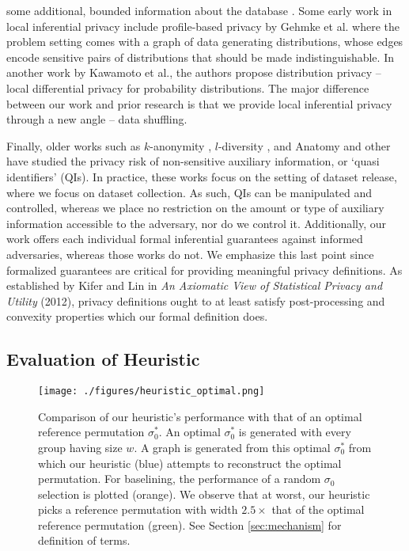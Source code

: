 some additional, bounded information about the database 
\cite{bounded}. Some early work in local inferential privacy include profile-based privacy \cite{profile} by Gehmke et al. where the problem setting comes with a graph of data generating distributions, whose edges encode sensitive pairs of distributions that should be made indistinguishable. In another work by Kawamoto et al., the authors propose distribution privacy \cite{takao} -- local differential privacy for probability distributions.    The major difference between our work and prior research is that we provide local inferential privacy through a new angle -- data shuffling. 

Finally, older works such as $k$-anonymity \cite{kanon},  $l$-diversity \cite{ldiv}, and Anatomy \cite{anatomy} and other \cite{older1, older2, older3, older4, older5} have studied the privacy risk of non-sensitive auxiliary information, or `quasi identifiers' (QIs). In practice, these works focus on the setting of dataset release, where we focus on dataset collection. As such, QIs can be manipulated and controlled, whereas we place no restriction on the amount or type of auxiliary information accessible to the adversary, nor do we control it. Additionally, our work offers each individual formal inferential guarantees against informed adversaries, whereas those works do not. We emphasize this last point since formalized guarantees are critical for providing meaningful privacy definitions. As established by Kifer and Lin in \emph{An Axiomatic View of Statistical Privacy and Utility} (2012), privacy definitions ought to at least satisfy post-processing and convexity properties which our formal definition does.



 
\newpage


\subsection{Evaluation of Heuristic}
\label{apx:heuristic eval}

\begin{figure}[h]
    \centering
    \texttt{[image: ./figures/heuristic\_optimal.png]}
    \caption{Comparison of our heuristic's performance with that of an optimal reference permutation $\sigma^*_0$. An optimal $\sigma^*_0$ is generated with every group having size $w$. A graph is generated from this optimal $\sigma^*_0$ from which our heuristic (blue) attempts to reconstruct the optimal permutation. For baselining, the performance of a random $\sigma_0$ selection is plotted (orange). We observe that at worst, our heuristic picks a reference permutation with width $2.5\times$ that of the optimal reference permutation (green). See Section \ref{sec:mechanism} for definition of terms.}
    \label{fig:heuristic optimal}
\end{figure}

